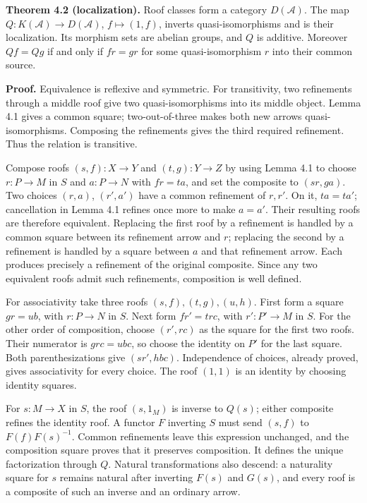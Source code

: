 \documentclass[
  english,
  11pt,
  a4paper,
]{article}
\begin{document}
\textbf{Theorem 4.2 (localization).} Roof classes form a category
\(D(\mathcal A)\). The map \(Q:K(\mathcal A)\to D(\mathcal A)\),
\(f\mapsto(1,f)\), inverts quasi-isomorphisms and is their localization.
Its morphism sets are abelian groups, and \(Q\) is additive. Moreover
\(Qf=Qg\) if and only if \(fr=gr\) for some quasi-isomorphism \(r\) into
their common source.

\textbf{Proof.} Equivalence is reflexive and symmetric. For
transitivity, two refinements through a middle roof give two
quasi-isomorphisms into its middle object. Lemma 4.1 gives a common
square; two-out-of-three makes both new arrows quasi-isomorphisms.
Composing the refinements gives the third required refinement. Thus the
relation is transitive.

Compose roofs \((s,f):X\to Y\) and \((t,g):Y\to Z\) by using Lemma 4.1
to choose \(r:P\to M\) in \(S\) and \(a:P\to N\) with \(fr=ta\), and set
the composite to \((sr,ga)\). Two choices \((r,a)\), \((r',a')\) have a
common refinement of \(r,r'\). On it, \(ta=ta'\); cancellation in Lemma
4.1 refines once more to make \(a=a'\). Their resulting roofs are
therefore equivalent. Replacing the first roof by a refinement is
handled by a common square between its refinement arrow and \(r\);
replacing the second by a refinement is handled by a square between
\(a\) and that refinement arrow. Each produces precisely a refinement of
the original composite. Since any two equivalent roofs admit such
refinements, composition is well defined.

For associativity take three roofs \((s,f),(t,g),(u,h)\). First form a
square \(g r=u b\), with \(r:P\to N\) in \(S\). Next form
\(f r'=t r c\), with \(r':P'\to M\) in \(S\). For the other order of
composition, choose \((r',rc)\) as the square for the first two roofs.
Their numerator is \(grc=ubc\), so choose the identity on \(P'\) for the
last square. Both parenthesizations give \((sr',hbc)\). Independence of
choices, already proved, gives associativity for every choice. The roof
\((1,1)\) is an identity by choosing identity squares.

For \(s:M\to X\) in \(S\), the roof \((s,1_M)\) is inverse to \(Q(s)\);
either composite refines the identity roof. A functor \(F\) inverting
\(S\) must send \((s,f)\) to \(F(f)F(s)^{-1}\). Common refinements leave
this expression unchanged, and the composition square proves that it
preserves composition. It defines the unique factorization through
\(Q\). Natural transformations also descend: a naturality square for
\(s\) remains natural after inverting \(F(s)\) and \(G(s)\), and every
roof is a composite of such an inverse and an ordinary arrow.
\end{document}
